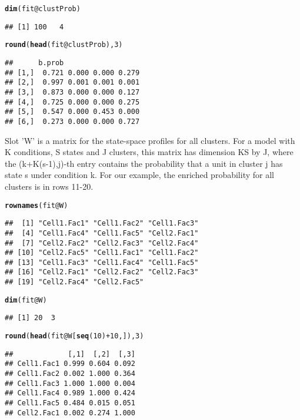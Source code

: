 \documentclass[a4paper,10pt]{article}\usepackage[]{graphicx}\usepackage[]{color}
\makeatletter
\newcommand{\hlnum}[1]{\textcolor[rgb]{0.686,0.059,0.569}{#1}}%
\newcommand{\hlopt}[1]{\textcolor[rgb]{0,0,0}{#1}}%
\newcommand{\hlstd}[1]{\textcolor[rgb]{0.345,0.345,0.345}{#1}}%
\newcommand{\hlkwc}[1]{\textcolor[rgb]{0.333,0.667,0.333}{#1}}%
\newcommand{\hlkwd}[1]{\textcolor[rgb]{0.737,0.353,0.396}{\textbf{#1}}}%
\newenvironment{kframe}{%
 \def\at@end@of@kframe{}%
 \ifinner\ifhmode%
  \def\at@end@of@kframe{\end{minipage}}%
  \begin{minipage}{\columnwidth}%
 \fi\fi%
 \def\FrameCommand##1{\hskip\@totalleftmargin \hskip-\fboxsep
 \colorbox{shadecolor}{##1}\hskip-\fboxsep
     \hskip-\linewidth \hskip-\@totalleftmargin \hskip\columnwidth}%
 \MakeFramed {\advance\hsize-\width
   \@totalleftmargin\z@ \linewidth\hsize
   \@setminipage}}%
 {\par\unskip\endMakeFramed%
 \at@end@of@kframe}
\newenvironment{knitrout}{}{} %
\makeatother
\begin{document}
\begin{knitrout}
\color{fgcolor}\begin{kframe}
\begin{alltt}
\hlkwd{dim}\hlstd{(fit}\hlopt{@}\hlkwc{clustProb}\hlstd{)}
\end{alltt}
\begin{verbatim}
## [1] 100   4
\end{verbatim}
\begin{alltt}
\hlkwd{round}\hlstd{(}\hlkwd{head}\hlstd{(fit}\hlopt{@}\hlkwc{clustProb}\hlstd{),}\hlnum{3}\hlstd{)}
\end{alltt}
\begin{verbatim}
##      b.prob                  
## [1,]  0.721 0.000 0.000 0.279
## [2,]  0.997 0.001 0.001 0.001
## [3,]  0.873 0.000 0.000 0.127
## [4,]  0.725 0.000 0.000 0.275
## [5,]  0.547 0.000 0.453 0.000
## [6,]  0.273 0.000 0.000 0.727
\end{verbatim}
\end{kframe}
\end{knitrout}

Slot 'W' is a matrix for the state-space profiles for all clusters. For a model with K conditions, S states and J clusters, this matrix has dimension KS by J, where the (k+K(s-1),j)-th entry contains the probability that a unit in cluster j has state s under condition k. For our example, the enriched probability for all clusters is in rows 11-20.

\begin{knitrout}
\color{fgcolor}\begin{kframe}
\begin{alltt}
\hlkwd{rownames}\hlstd{(fit}\hlopt{@}\hlkwc{W}\hlstd{)}
\end{alltt}
\begin{verbatim}
##  [1] "Cell1.Fac1" "Cell1.Fac2" "Cell1.Fac3"
##  [4] "Cell1.Fac4" "Cell1.Fac5" "Cell2.Fac1"
##  [7] "Cell2.Fac2" "Cell2.Fac3" "Cell2.Fac4"
## [10] "Cell2.Fac5" "Cell1.Fac1" "Cell1.Fac2"
## [13] "Cell1.Fac3" "Cell1.Fac4" "Cell1.Fac5"
## [16] "Cell2.Fac1" "Cell2.Fac2" "Cell2.Fac3"
## [19] "Cell2.Fac4" "Cell2.Fac5"
\end{verbatim}
\begin{alltt}
\hlkwd{dim}\hlstd{(fit}\hlopt{@}\hlkwc{W}\hlstd{)}
\end{alltt}
\begin{verbatim}
## [1] 20  3
\end{verbatim}
\begin{alltt}
\hlkwd{round}\hlstd{(}\hlkwd{head}\hlstd{(fit}\hlopt{@}\hlkwc{W}\hlstd{[}\hlkwd{seq}\hlstd{(}\hlnum{10}\hlstd{)} \hlopt{+} \hlnum{10}\hlstd{, ]),}\hlnum{3}\hlstd{)}
\end{alltt}
\begin{verbatim}
##             [,1]  [,2]  [,3]
## Cell1.Fac1 0.999 0.604 0.092
## Cell1.Fac2 0.002 1.000 0.364
## Cell1.Fac3 1.000 1.000 0.004
## Cell1.Fac4 0.989 1.000 0.424
## Cell1.Fac5 0.484 0.015 0.051
## Cell2.Fac1 0.002 0.274 1.000
\end{verbatim}
\end{kframe}
\end{knitrout}
\end{document}
